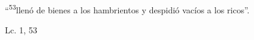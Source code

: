 \documentclass[../../rosario.tex]{subfiles}
\begin{document}
    ``\textsuperscript{53}llenó de bienes a los hambrientos y despidió vacíos a los ricos''.
    \begin{flushright}
    Lc. 1, 53
    \end{flushright}
\end{document}
